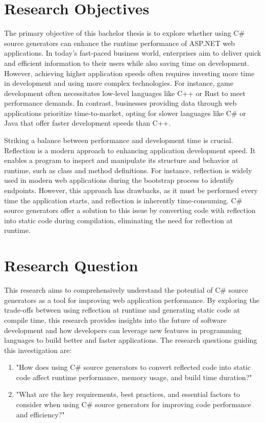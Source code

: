 \section{Research Objectives}

The primary objective of this bachelor thesis is to explore whether using C\# source generators can enhance the runtime performance of ASP.NET web applications. In today's fast-paced business world, enterprises aim to deliver quick and efficient information to their users while also saving time on development. However, achieving higher application speeds often requires investing more time in development and using more complex technologies. For instance, game development often necessitates low-level languages like C++ or Rust to meet performance demands. In contrast, businesses providing data through web applications prioritize time-to-market, opting for slower languages like C\# or Java that offer faster development speeds than C++.

Striking a balance between performance and development time is crucial. Reflection is a modern approach to enhancing application development speed. It enables a program to inspect and manipulate its structure and behavior at runtime, such as class and method definitions. For instance, reflection is widely used in modern web applications during the bootstrap process to identify endpoints. However, this approach has drawbacks, as it must be performed every time the application starts, and reflection is inherently time-consuming. C\# source generators offer a solution to this issue by converting code with reflection into static code during compilation, eliminating the need for reflection at runtime.

\section{Research Question}

This research aims to comprehensively understand the potential of C\# source generators as a tool for improving web application performance. By exploring the trade-offs between using reflection at runtime and generating static code at compile time, this research provides insights into the future of software development and how developers can leverage new features in programming languages to build better and faster applications. The research questions guiding this investigation are:

\begin{enumerate}[label=\textbf{RQ.\arabic*}:, leftmargin=*, labelindent=1em]
    \item "How does using C\# source generators to convert reflected code into static code affect runtime performance, memory usage, and build time duration?"
    \item "What are the key requirements, best practices, and essential factors to consider when using C\# source generators for improving code performance and efficiency?"
\end{enumerate}

